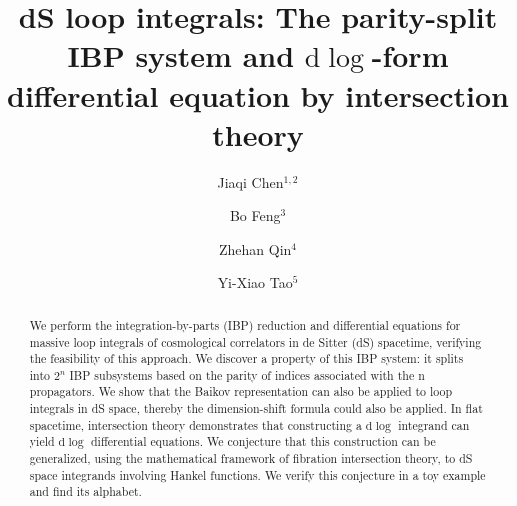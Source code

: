 \documentclass[%
 reprint,
 amsmath,amssymb,
 aps,
prd,
]{revtex4-2}
\def\di{{\mathrm{d}}}
\begin{document}
\title{dS loop integrals: The parity-split IBP system and $\di\log$-form differential equation by intersection theory}





\author{Jiaqi Chen$^{1,2}$}

\author{Bo Feng$^{3}$}

\author{Zhehan Qin$^{4}$}

\author{Yi-Xiao Tao$^{5}$}

\address{$^{1}$Beijing Key Laboratory of Optical Detection Technology for Oil and Gas, China University of Petroleum-Beijing, Beijing 102249, China\\
$^{2}$Basic Research Center for Energy Interdisciplinary, College of Science, China University of Petroleum-Beijing, Beijing 102249, China\\
$^{3}$-------------++++++-------------\\
$^{4}$Department of Physics, Tsinghua University, Beijing 100084, China\\
$^{5}$Department of Mathematical Sciences, Tsinghua University, Beijing 100084, China}







\begin{abstract}
We perform the integration-by-parts (IBP) reduction and differential equations for massive loop integrals of cosmological correlators in de Sitter (dS) spacetime, verifying the feasibility of this approach. We discover a property of this IBP system: it splits into $2^n$ IBP subsystems based on the parity of indices associated with the n propagators. We show that the Baikov representation can also be applied to loop integrals in dS space, thereby the dimension-shift formula could also be applied. In flat spacetime, intersection theory demonstrates that constructing a $\di\log$ integrand can yield $\di\log$ differential equations. We conjecture that this construction can be generalized, using the mathematical framework of fibration intersection theory, to dS space integrands involving Hankel functions. We verify this conjecture in a toy example and find its alphabet.
\end{abstract}




	
\maketitle
\end{document}

